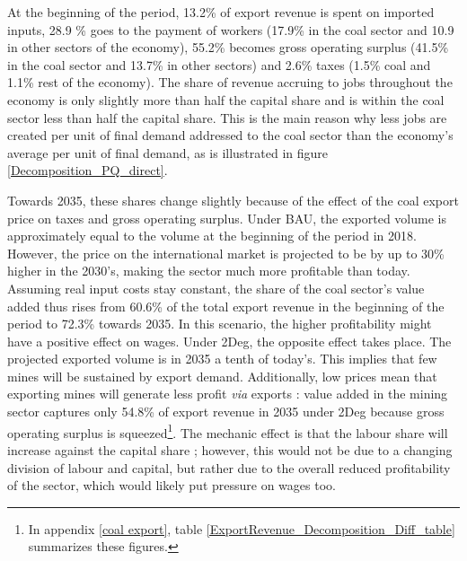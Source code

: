 \documentclass[12pt,english]{article}
\begin{document}
At the beginning of the period, 13.2\% of export revenue is spent on imported inputs, 28.9 \% goes to the payment of workers (17.9\% in the coal sector and 10.9 in other sectors of the economy), 55.2\% becomes gross operating surplus (41.5\% in the coal sector and 13.7\% in other sectors) and 2.6\% taxes (1.5\% coal and 1.1\% rest of the economy). %
The share of revenue accruing to jobs throughout the economy is only slightly more than half the capital share and is within the coal sector less than half the capital share. This is the main reason why less jobs are created per unit of final demand addressed to the coal sector than the economy's average per unit of final demand, as is illustrated in figure \ref{Decomposition_PQ_direct}.

Towards 2035, these shares change slightly because of the effect of the coal export price on taxes and gross operating surplus. Under BAU, the exported volume is approximately equal to the volume at the beginning of the period in 2018. However, the price on the international market is projected to be by up to 30\% higher in the 2030's, making the sector much more profitable than today. Assuming real input costs stay constant, the share of the coal sector's value added thus rises from 60.6\% of the total export revenue in the beginning of the period to 72.3\% towards 2035. In this scenario, the higher profitability might have a positive effect on wages. Under 2Deg, the opposite effect takes place. The projected exported volume is in 2035 a tenth of today's. This implies that few mines will be sustained by export demand. Additionally, low prices mean that exporting mines will generate less profit \textit{via} exports : value added in the mining sector captures only 54.8\% of export revenue in 2035 under 2Deg because gross operating surplus is squeezed\footnote{In appendix \ref{coal export}, table \ref{ExportRevenue_Decomposition_Diff_table} summarizes these figures.}. The mechanic effect is that the labour share will increase against the capital share ; however, this would not be due to a changing division of labour and capital, but rather due to the overall reduced profitability of the sector, which would likely put pressure on wages too. 
\end{document}
